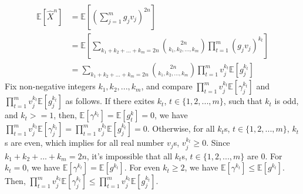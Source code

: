 \begin{align}
    \nonumber \mathbb{E}[\widehat{X}^n]&=\mathbb{E}\left[\left(\sum_{j=1}^{m}g_jv_j\right)^{2n}\right]\\
    \nonumber &=\mathbb{E}\left[\sum_{k_1+k_2+...+k_m=2n}\binom{2n}{k_1,k_2,...,k_m}\prod_{t=1}^{m}(g_jv_j)^{k_t} \right]\\
    \nonumber &=\sum_{k_1+k_2+...+k_m=2n}\binom{2n}{k_1,k_2,...,k_m}\prod_{t=1}^{m}v_j^{k_t}\mathbb{E}\left[g_j^{k_t}\right]
\end{align}
Fix non-negative integers $k_1,k_2,...,k_m$, and compare  $\prod_{t=1}^{m}v_j^{k_t}\mathbb{E}\left[\gamma_j^{k_t}\right]$ and $\prod_{t=1}^{m}v_j^{k_t}\mathbb{E}\left[g_j^{k_t}\right]$ as follows.
If there exites $k_t$, $t\in\{1,2,...,m\}$, such that $k_t$ is odd, and $k_t>=1$, then, $\mathbb{E}[\gamma^{k_t}]=\mathbb{E}[g^k_t]=0$, we have $\prod_{t=1}^{m}v_j^{k_t}\mathbb{E}\left[\gamma_j^{k_t}\right]=\prod_{t=1}^{m}v_j^{k_t}\mathbb{E}\left[g_j^{k_t}\right]=0$.
Otherwise, for all $k_t$s, $t\in\{1,2,...,m\}$, $k_t$s are even, which implies for all real number $v_j$s, $v_j^{k_t}\ge 0$. 
Since $k_1+k_2+...+k_m=2n$, it's impossible that all $k_t$s, $t\in \{1,2,...,m\}$ are 0.
For $k_t=0$, we have $\mathbb{E}[\gamma^{k_t}]=\mathbb{E}[g^{k_t}]$.
For even $k_t\ge 2$, we have $\mathbb{E}[\gamma^{k_t}]\le\mathbb{E}[g^{k_t}]$. 
Then, $\prod_{t=1}^{m}v_j^{k_t}\mathbb{E}\left[\gamma_j^{k_t}\right]\le \prod_{t=1}^{m}v_j^{k_t}\mathbb{E}\left[g_j^{k_t}\right]$.

